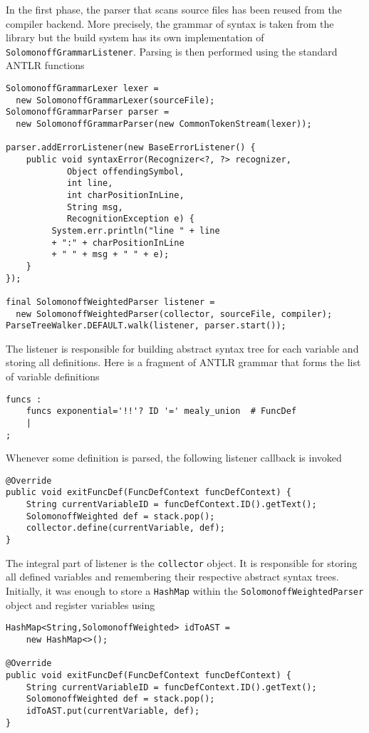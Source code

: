 In the first phase, the parser that scans source files has been reused from the compiler backend. More precisely, the grammar of syntax is taken from the library but the build system has its own implementation of \texttt{SolomonoffGrammarListener}. Parsing is then performed using the standard ANTLR functions
\begin{lstlisting}
SolomonoffGrammarLexer lexer =
  new SolomonoffGrammarLexer(sourceFile);
SolomonoffGrammarParser parser =
  new SolomonoffGrammarParser(new CommonTokenStream(lexer));

parser.addErrorListener(new BaseErrorListener() {
    public void syntaxError(Recognizer<?, ?> recognizer, 
            Object offendingSymbol, 
            int line,
            int charPositionInLine, 
            String msg, 
            RecognitionException e) {
         System.err.println("line " + line 
         + ":" + charPositionInLine 
         + " " + msg + " " + e);
    }
});

final SolomonoffWeightedParser listener =
  new SolomonoffWeightedParser(collector, sourceFile, compiler);
ParseTreeWalker.DEFAULT.walk(listener, parser.start());
\end{lstlisting}
The listener is responsible for building abstract syntax tree for each variable and storing all definitions. Here is a fragment of ANTLR grammar that forms the list of variable definitions 
\begin{lstlisting}
funcs :
    funcs exponential='!!'? ID '=' mealy_union  # FuncDef
    | 
;
\end{lstlisting} 
Whenever some definition is parsed, the following listener callback is invoked
\begin{lstlisting}
@Override
public void exitFuncDef(FuncDefContext funcDefContext) {
    String currentVariableID = funcDefContext.ID().getText();
    SolomonoffWeighted def = stack.pop();
    collector.define(currentVariable, def);
}
\end{lstlisting}
The integral part of listener is the \texttt{collector} object. It is responsible for storing all defined variables and remembering their respective abstract syntax trees. Initially, it was enough to store a \texttt{HashMap} within the \texttt{SolomonoffWeightedParser} object and register variables using 
\begin{lstlisting}
HashMap<String,SolomonoffWeighted> idToAST = 
    new HashMap<>();
    
@Override
public void exitFuncDef(FuncDefContext funcDefContext) {
    String currentVariableID = funcDefContext.ID().getText();
    SolomonoffWeighted def = stack.pop();
    idToAST.put(currentVariable, def);
}
\end{lstlisting}
